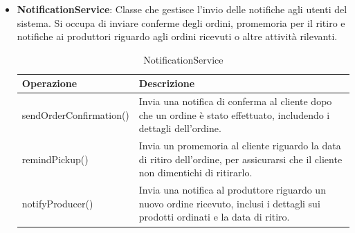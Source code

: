 \begin{itemize}
\item \textbf{NotificationService}:
Classe che gestisce l'invio delle notifiche agli utenti del sistema. Si occupa di inviare conferme degli ordini, promemoria per il ritiro e notifiche ai produttori riguardo agli ordini ricevuti o altre attività rilevanti.
\begin{table}[!htbp]
    \centering
    \begin{tabularx}{0.9\textwidth}{ >{\centering\arraybackslash}m{4cm} | X  } 
    \hline
         \textbf{Operazione} & \textbf{Descrizione} \\
         \hline
         sendOrderConfirmation() & Invia una notifica di conferma al cliente dopo che un ordine è stato effettuato, includendo i dettagli dell'ordine. \\
         \hline
         remindPickup() & Invia un promemoria al cliente riguardo la data di ritiro dell'ordine, per assicurarsi che il cliente non dimentichi di ritirarlo. \\
         \hline
         notifyProducer() & Invia una notifica al produttore riguardo un nuovo ordine ricevuto, inclusi i dettagli sui prodotti ordinati e la data di ritiro. \\
         \hline
    \end{tabularx}
    \caption{NotificationService}
\end{table}

\end{itemize}